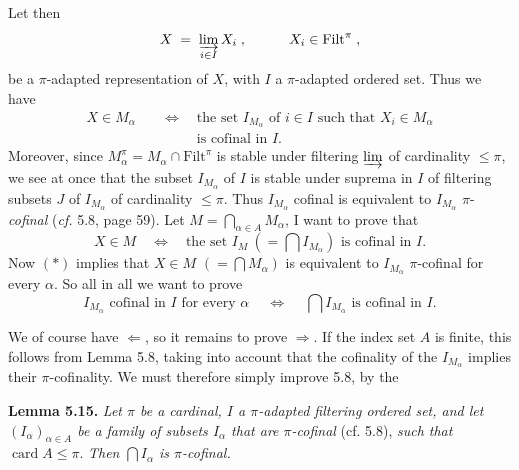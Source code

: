 \documentclass[11pt]{article}
\newcommand{\printedpage}[1]{\marginpar{\footnotesize p.~#1}}
\newcommand{\msp}[1]{\marginpar{\footnotesize [#1]}}
\newcommand{\Filt}{\mathrm{Filt}}
\newcommand{\card}{\operatorname{card}}
\begin{document}
\msp{page 69}
Let then
\[
X \;=\; \varinjlim_{i\in I} X_{i} \; , \qquad\quad X_{i} \in \Filt^{\pi} \; ,
\]
be a $\pi$-adapted representation of $X$, with $I$ a $\pi$-adapted ordered set. Thus we have
\[
\begin{aligned}
X \in M_{\alpha} \quad &\Longleftrightarrow \quad \text{the set } I_{M_{\alpha}} \text{ of } i \in I \text{ such that } X_{i} \in M_{\alpha}\\
&\phantom{\Longleftrightarrow} \quad \text{is cofinal in } I.
\end{aligned}
\tag*{$(*)$}
\]
Moreover, since $M_{\alpha}^{\pi} = M_{\alpha} \cap \Filt^{\pi}$ is stable under filtering $\varinjlim$ of cardinality $\leq \pi$, we see at once that the subset $I_{M_{\alpha}}$ of $I$ is stable under suprema in $I$ of filtering subsets $J$ of $I_{M_{\alpha}}$ of cardinality $\leq \pi$. Thus $I_{M_{\alpha}}$ cofinal is equivalent to $I_{M_{\alpha}}$ $\pi$-\textit{cofinal} (\textit{cf.} 5.8, page 59). Let $M = \bigcap_{\alpha\in A} M_{\alpha}$, I want to prove that
\[
X \in M \quad \Longleftrightarrow \quad \text{the set } I_{M} \ (= \textstyle\bigcap I_{M_{\alpha}}) \text{ is cofinal in } I.
\tag*{$(**)$}
\]
Now $(*)$ implies that $X \in M$ $(= \bigcap M_{\alpha})$ is equivalent to $I_{M_{\alpha}}$ $\pi$-cofinal for every $\alpha$. So all in all we want to prove
\[
I_{M_{\alpha}} \text{ cofinal in } I \text{ for every } \alpha \quad\ \Longleftrightarrow \quad\ \textstyle\bigcap I_{M_{\alpha}} \text{ is cofinal in } I.
\tag*{$(***)$}
\]

\msp{page 70}
We of course have $\Longleftarrow$, so it remains to prove $\Longrightarrow$. If the index set $A$ is finite, this follows from Lemma 5.8, taking into account that the cofinality of the $I_{M_{\alpha}}$ implies their $\pi$-cofinality. We must therefore simply improve 5.8, by the

\printedpage{40}

\textbf{Lemma 5.15.} \textit{Let $\pi$ be a cardinal, $I$ a $\pi$-adapted filtering ordered set, and let $(I_{\alpha})_{\alpha\in A}$ be a family of subsets $I_{\alpha}$ that are $\pi$-cofinal} (cf. 5.8), \textit{such that} $\card A \leq \pi$. \textit{Then $\bigcap I_{\alpha}$ is $\pi$-cofinal.}
\end{document}
